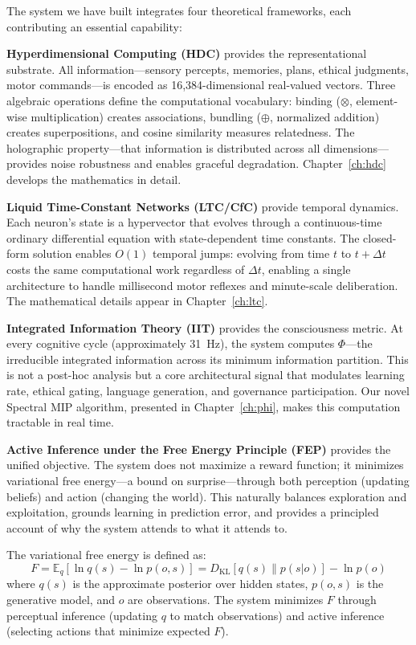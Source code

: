 \documentclass[12pt]{book}
\newcommand{\bind}{\otimes}
\newcommand{\bundle}{\oplus}
\newcommand{\E}{\mathbb{E}}
\begin{document}
The system we have built integrates four theoretical frameworks, each contributing an essential capability:

\textbf{Hyperdimensional Computing (HDC)} provides the representational substrate. All information---sensory percepts, memories, plans, ethical judgments, motor commands---is encoded as 16,384-dimensional real-valued vectors. Three algebraic operations define the computational vocabulary: binding ($\bind$, element-wise multiplication) creates associations, bundling ($\bundle$, normalized addition) creates superpositions, and cosine similarity measures relatedness. The holographic property---that information is distributed across all dimensions---provides noise robustness and enables graceful degradation. Chapter~\ref{ch:hdc} develops the mathematics in detail.

\textbf{Liquid Time-Constant Networks (LTC/CfC)} provide temporal dynamics. Each neuron's state is a hypervector that evolves through a continuous-time ordinary differential equation with state-dependent time constants. The closed-form solution enables $O(1)$ temporal jumps: evolving from time $t$ to $t + \Delta t$ costs the same computational work regardless of $\Delta t$, enabling a single architecture to handle millisecond motor reflexes and minute-scale deliberation. The mathematical details appear in Chapter~\ref{ch:ltc}.

\textbf{Integrated Information Theory (IIT)} provides the consciousness metric. At every cognitive cycle (approximately 31~Hz), the system computes $\Phi$---the irreducible integrated information across its minimum information partition. This is not a post-hoc analysis but a core architectural signal that modulates learning rate, ethical gating, language generation, and governance participation. Our novel Spectral MIP algorithm, presented in Chapter~\ref{ch:phi}, makes this computation tractable in real time.

\textbf{Active Inference under the Free Energy Principle (FEP)} provides the unified objective. The system does not maximize a reward function; it minimizes variational free energy---a bound on surprise---through both perception (updating beliefs) and action (changing the world). This naturally balances exploration and exploitation, grounds learning in prediction error, and provides a principled account of why the system attends to what it attends to.

The variational free energy is defined as:
\begin{equation}\label{eq:fep}
F = \E_q\!\left[\ln q(s) - \ln p(o, s)\right] = D_{\text{KL}}[q(s) \| p(s|o)] - \ln p(o)
\end{equation}
where $q(s)$ is the approximate posterior over hidden states, $p(o, s)$ is the generative model, and $o$ are observations. The system minimizes $F$ through perceptual inference (updating $q$ to match observations) and active inference (selecting actions that minimize expected $F$).
\end{document}
